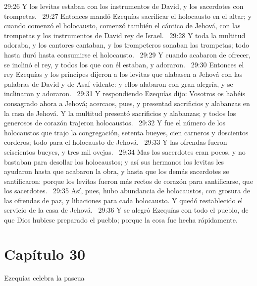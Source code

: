 																													29:26 Y los levitas estaban con los instrumentos de David, y los sacerdotes con trompetas.  
																													29:27 Entonces mandó Ezequías sacrificar el holocausto en el altar; y cuando comenzó el holocausto, comenzó también el cántico de Jehová, con las trompetas y los instrumentos de David rey de Israel.  
																													29:28 Y toda la multitud adoraba, y los cantores cantaban, y los trompeteros sonaban las trompetas; todo hasta duró hasta consumirse el holocausto.  
																													29:29 Y cuando acabaron de ofrecer, se inclinó el rey, y todos los que con él estaban, y adoraron.  
																													29:30 Entonces el rey Ezequías y los príncipes dijeron a los levitas que alabasen a Jehová con las palabras de David y de Asaf vidente: y ellos alabaron con gran alegría, y se inclinaron y adoraron.  
																													29:31 Y respondiendo Ezequías dijo: Vosotros os habéis consagrado ahora a Jehová; acercaos, pues, y presentad sacrificios y alabanzas en la casa de Jehová. Y la multitud presentó sacrificios y alabanzas; y todos los generosos de corazón trajeron holocaustos.  
																													29:32 Y fue el número de los holocaustos que trajo la congregación, setenta bueyes, cien carneros y doscientos corderos; todo para el holocausto de Jehová.  
																													29:33 Y las ofrendas fueron seiscientos bueyes, y tres mil ovejas.  
																													29:34 Mas los sacerdotes eran pocos, y no bastaban para desollar los holocaustos; y así sus hermanos los levitas les ayudaron hasta que acabaron la obra, y hasta que los demás sacerdotes se santificaron: porque los levitas fueron más rectos de corazón para santificarse, que los sacerdotes.  
																													29:35 Así, pues, hubo abundancia de holocaustos, con grosura de las ofrendas de paz, y libaciones para cada holocausto. Y quedó restablecido el servicio de la casa de Jehová.  
																													29:36 Y se alegró Ezequías con todo el pueblo, de que Dios hubiese preparado el pueblo; porque la cosa fue hecha rápidamente.  
																													\section*{Capítulo 30 }
																														Ezequías celebra la pascua  
																														
